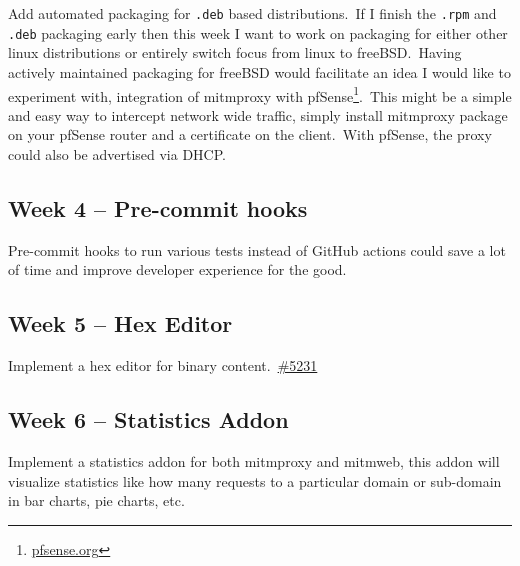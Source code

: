 Add automated packaging for \texttt{.deb} based distributions.\ If I finish the \texttt{.rpm} and \texttt{.deb}
packaging early then this week I want to work on packaging for either other linux distributions or entirely
switch focus from linux to freeBSD.\ Having actively maintained packaging for freeBSD would facilitate an idea I
would like to experiment with, integration of mitmproxy with
pfSense\footnote{\href{https://www.pfsense.org}{pfsense.org}}.\ This might be a simple and easy way to intercept
network wide traffic, simply install mitmproxy package on your pfSense router and a certificate on the client.\
With pfSense, the proxy could also be advertised via DHCP.\


\subsection{Week 4 -- Pre-commit hooks}
\label{subsec:week-4}

Pre-commit hooks to run various tests instead of GitHub actions could save a lot of time and improve developer
experience for the good.


\subsection{Week 5 -- Hex Editor}
\label{subsec:week-5}

Implement a hex editor for binary content.\ \href{https://github.com/mitmproxy/mitmproxy/issues/5231}{\#5231}


\subsection{Week 6 -- Statistics Addon}
\label{subsec:week-6}

Implement a statistics addon for both mitmproxy and mitmweb, this addon will visualize statistics like how many
requests to a particular domain or sub-domain in bar charts, pie charts, etc.\


